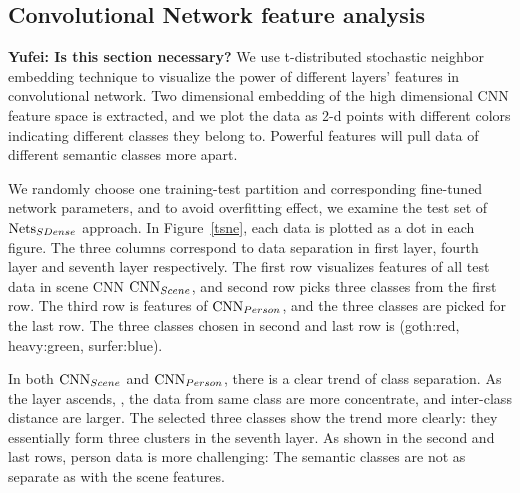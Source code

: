 \documentclass[10pt,twocolumn,letterpaper]{article}
\begin{document}

\subsection{Convolutional Network feature analysis}
\textbf{Yufei: Is this section necessary?}
We use t-distributed stochastic neighbor embedding technique \cite{tsne} to visualize the power of different layers' features in convolutional network. Two dimensional embedding of the high dimensional CNN feature space is extracted, and we plot the data as 2-d points with different colors indicating different classes they belong to. Powerful features will pull data of different semantic classes more apart.

We randomly choose one training-test partition and corresponding fine-tuned network parameters, and to avoid overfitting effect, we examine the test set of $\textup{Nets}_{SDense}$ approach. In Figure~\ref{tsne}, each data is plotted as a dot in each figure. The three columns correspond to data separation in first layer, fourth layer and seventh layer respectively. The first row visualizes features of all test data in scene CNN $\textup{CNN}_{Scene}$, and second row picks three classes from the first row. The third row is features of $\textup{CNN}_{Person}$, and the three classes are picked for the last row. The three classes chosen in second and last row is (goth:red, heavy:green, surfer:blue).

In both $\textup{CNN}_{Scene}$ and $\textup{CNN}_{Person}$, there is a clear trend of class separation. As the layer ascends, , the data from same class are more concentrate, and inter-class distance are larger. The selected three classes show the trend more clearly: they essentially form three clusters in the seventh layer. 
As shown in the second and last rows, person data is more challenging: The semantic classes are not as separate as with the scene features. 
\end{document}
